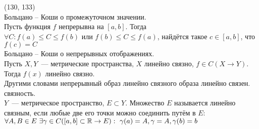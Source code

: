 (130, 133)\\
 Больцано -- Коши о промежуточном значении.\\
Пусть функция $f$ непрерывна на $[a, b]$. Тогда $\forall C: f(a) \leq C \leq f(b) \text{ или } f(b) \leq C \leq f(a)$, найдётся такое $c \in [a, b]$, что $f(c) = C$\\
 Больцано -- Коши о непрерывных отображениях.\\
Пусть $X, Y$~--- метрические пространства, $X$ линейно связно, $f \in C(X\to Y)$. Тогда $f(x)$ линейно связно.\\
Другими словами непрерывный образ линейно связного образа линейно связен.\\
 связность.\\
$Y$~--- метрическое пространство, $E \subset Y$. Множество $E$ называется линейно связным, если любые две его точки можно соединить путём в $E$: $\forall A, B \in E\ \exists \gamma \in C([a, b] \subset \mathbb{R} \to E):\ \gamma(a) = A, \gamma = A, \gamma(b) = b$
